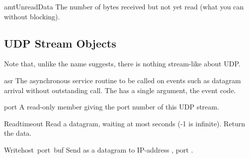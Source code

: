 \begin{datadesc}{amtUnreadData}
The number of bytes received but not yet read (what you can 
without blocking).
\end{datadesc}



\subsection{UDP Stream Objects}
Note that, unlike the name suggests, there is nothing stream-like
about UDP.

\renewcommand{\indexsubitem}{(UDP stream attribute)}

\begin{datadesc}{asr}
The asynchronous service routine to be called on events such as
datagram arrival without outstanding  call. The  has a
single argument, the event code.
\end{datadesc}

\begin{datadesc}{port}
A read-only member giving the port number of this UDP stream.
\end{datadesc}

\renewcommand{\indexsubitem}{(UDP stream method)}

\begin{funcdesc}{Read}{timeout}
Read a datagram, waiting at most  seconds (-1 is
infinite).  Return the data.
\end{funcdesc}

\begin{funcdesc}{Write}{host\, port\, buf}
Send  as a datagram to IP-address , port
.
\end{funcdesc}
